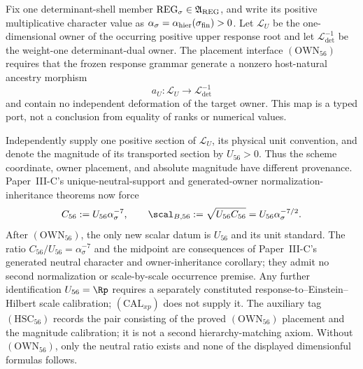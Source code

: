 \documentclass[11pt,a4paper]{article}
\begin{document}
\begin{definition}
\label{p3d:def:owner-typed-upper-scale-placement}
Fix one determinant-shell member
\(\mathrm{REG}_\sigma\in\mathfrak A_{\rm REG}\), and write its positive
multiplicative character value as
\(\alpha_\sigma=\alpha_{\rm hier}(\sigma_{\rm fin})>0\).  Let
\(\mathcal L_U\) be the one-dimensional owner of the occurring positive upper
response root and let \(\mathcal L_{\det}^{-1}\) be the weight-one
determinant-dual owner.  The placement interface \((\mathrm{OWN}_{56})\)
requires that the frozen response grammar generate a nonzero host-natural
ancestry morphism
\[
 a_U:\mathcal L_U\longrightarrow\mathcal L_{\det}^{-1}
\]
and contain no independent deformation of the target owner.  This map is a
typed port, not a conclusion from equality of ranks or numerical values.

Independently supply one positive section of \(\mathcal L_U\), its physical
unit convention, and denote the magnitude of its transported section by
\(U_{56}>0\).  Thus the scheme coordinate, owner placement, and absolute
magnitude have different provenance.  Paper~III-C's unique-neutral-support
and generated-owner normalization-inheritance theorems now force
\[
 C_{56}:=U_{56}\alpha_\sigma^{-7},
 \qquad
 \scal_{B,56}:=\sqrt{U_{56}C_{56}}
 =U_{56}\alpha_\sigma^{-7/2}.
\]
After \((\mathrm{OWN}_{56})\), the only new scalar datum is \(U_{56}\) and
its unit standard.  The ratio
\(C_{56}/U_{56}=\alpha_\sigma^{-7}\) and the midpoint are consequences of
Paper~III-C's generated neutral character and owner-inheritance corollary;
they admit no second normalization or scale-by-scale occurrence premise.  Any further identification
\(U_{56}=\Rp\) requires a separately constituted response-to--Einstein--Hilbert
scale calibration; \((\mathrm{CAL}_{xp})\) does not supply it.  The auxiliary
tag \((\mathrm{HSC}_{56})\) records the pair consisting of the proved
\((\mathrm{OWN}_{56})\) placement and the magnitude calibration; it is not a
second hierarchy-matching axiom.  Without \((\mathrm{OWN}_{56})\), only the
neutral ratio exists and none of the displayed dimensionful formulas follows.
\end{definition}
\end{document}
